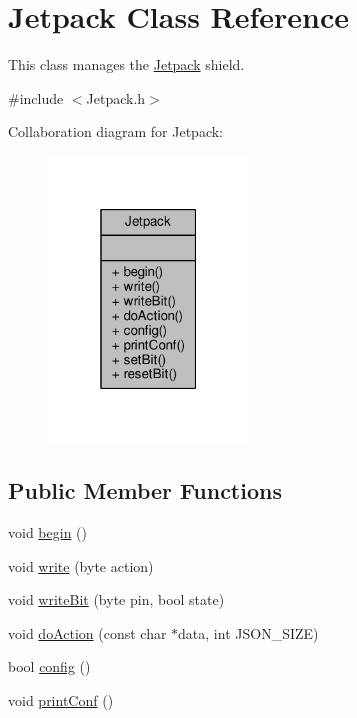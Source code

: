 \hypertarget{class_jetpack}{}\section{Jetpack Class Reference}
\label{class_jetpack}


This class manages the \hyperlink{class_jetpack}{Jetpack} shield.  




{\ttfamily \#include $<$Jetpack.\+h$>$}



Collaboration diagram for Jetpack\+:
\nopagebreak
\begin{figure}[H]
\begin{center}
\leavevmode
\includegraphics[width=151pt]{class_jetpack__coll__graph}
\end{center}
\end{figure}
\subsection*{Public Member Functions}
\begin{DoxyCompactItemize}
\item 
void \hyperlink{class_jetpack_a5a53e1ebf7aaf3bf3e0d37ea64ca09a7}{begin} ()
\item 
void \hyperlink{class_jetpack_a338f1af8cbc6504ac69b47c7328569b5}{write} (byte action)
\item 
void \hyperlink{class_jetpack_a79ae7bc3c1828a0551a7c005c4f8bd00}{write\+Bit} (byte pin, bool state)
\item 
void \hyperlink{class_jetpack_a86d2e83436ef4b85f4c3a6e85ac785b0}{do\+Action} (const char $\ast$data, int J\+S\+O\+N\+\_\+\+S\+I\+ZE)
\item 
bool \hyperlink{class_jetpack_ab065ee83e244265a2223a22f3ee4a719}{config} ()
\item 
void \hyperlink{class_jetpack_ac54a7bb4f9166bee32052253d9b1d306}{print\+Conf} ()
\end{DoxyCompactItemize}

